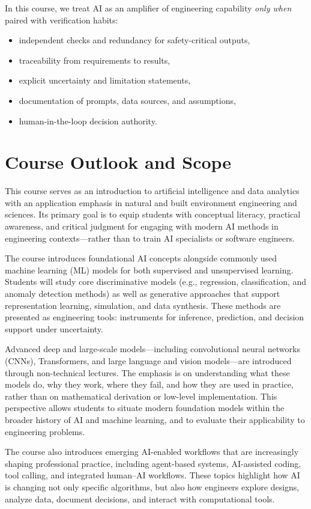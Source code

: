 \documentclass[12pt]{article}
\begin{document}
In this course, we treat AI as an amplifier of engineering capability \emph{only when} paired with verification habits:
\begin{itemize}
\item independent checks and redundancy for safety-critical outputs,
\item traceability from requirements to results,
\item explicit uncertainty and limitation statements,
\item documentation of prompts, data sources, and assumptions,
\item human-in-the-loop decision authority.
\end{itemize}


\section*{Course Outlook and Scope}

This course serves as an introduction to artificial intelligence and data analytics with an application emphasis in natural and built environment engineering and sciences. Its primary goal is to equip students with conceptual literacy, practical awareness, and critical judgment for engaging with modern AI methods in engineering contexts—rather than to train AI specialists or software engineers.

The course introduces foundational AI concepts alongside commonly used machine learning (ML) models for both supervised and unsupervised learning. Students will study core discriminative models (e.g., regression, classification, and anomaly detection methods) as well as generative approaches that support representation learning, simulation, and data synthesis. These methods are presented as engineering tools: instruments for inference, prediction, and decision support under uncertainty.

Advanced deep and large-scale models—including convolutional neural networks (CNNs), Transformers, and large language and vision models—are introduced through non-technical lectures. The emphasis is on understanding what these models do, why they work, where they fail, and how they are used in practice, rather than on mathematical derivation or low-level implementation. This perspective allows students to situate modern foundation models within the broader history of AI and machine learning, and to evaluate their applicability to engineering problems.

The course also introduces emerging AI-enabled workflows that are increasingly shaping professional practice, including agent-based systems, AI-assisted coding, tool calling, and integrated human–AI workflows. These topics highlight how AI is changing not only specific algorithms, but also how engineers explore designs, analyze data, document decisions, and interact with computational tools.
\end{document}
